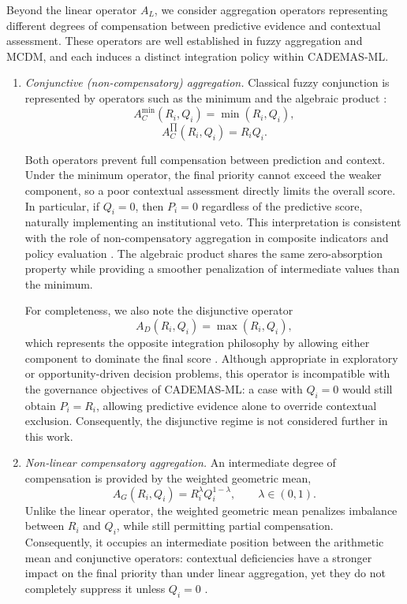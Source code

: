 \documentclass[mathematics,article,submit,moreauthors]{Definitions/mdpi}
\begin{document}
Beyond the linear operator $A_L$, we consider aggregation operators representing different degrees of compensation between predictive evidence and contextual assessment. These operators are well established in fuzzy aggregation and MCDM, and each induces a distinct integration policy within CADEMAS-ML.

\begin{enumerate}

\item \emph{Conjunctive (non-compensatory) aggregation.}
Classical fuzzy conjunction is represented by operators such as the minimum and the algebraic product \citep{Zimmermann1980}:
\begin{equation}
A_C^{\min}(R_i,Q_i)=\min(R_i,Q_i),
\end{equation}
\begin{equation}
A_C^{\prod}(R_i,Q_i)=R_iQ_i.
\end{equation}

Both operators prevent full compensation between prediction and context. Under the minimum operator, the final priority cannot exceed the weaker component, so a poor contextual assessment directly limits the overall score. In particular, if $Q_i=0$, then $P_i=0$ regardless of the predictive score, naturally implementing an institutional veto. This interpretation is consistent with the role of non-compensatory aggregation in composite indicators and policy evaluation \citep{Natoli2024,Blancas2024}. The algebraic product shares the same zero-absorption property while providing a smoother penalization of intermediate values than the minimum.

For completeness, we also note the disjunctive operator
\begin{equation}
A_D(R_i,Q_i)=\max(R_i,Q_i),
\end{equation}
which represents the opposite integration philosophy by allowing either component to dominate the final score \citep{Zimmermann1980}. Although appropriate in exploratory or opportunity-driven decision problems, this operator is incompatible with the governance objectives of CADEMAS-ML: a case with $Q_i=0$ would still obtain $P_i=R_i$, allowing predictive evidence alone to override contextual exclusion. Consequently, the disjunctive regime is not considered further in this work.

\item \emph{Non-linear compensatory aggregation.}
An intermediate degree of compensation is provided by the weighted geometric mean,
{\color{red}
\begin{equation}
A_G(R_i,Q_i)=R_i^{\lambda}Q_i^{1-\lambda},
\qquad \lambda\in(0,1).
\end{equation}
}
Unlike the linear operator, the weighted geometric mean penalizes imbalance between $R_i$ and $Q_i$, while still permitting partial compensation. Consequently, it occupies an intermediate position between the arithmetic mean and conjunctive operators: contextual deficiencies have a stronger impact on the final priority than under linear aggregation, yet they do not completely suppress it unless $Q_i=0$ \citep{Natoli2024,Blancas2024}.

\end{enumerate}
\end{document}
